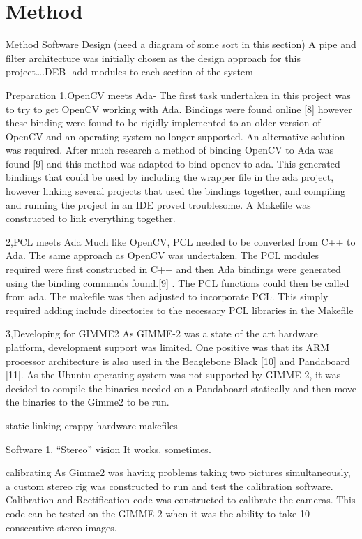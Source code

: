 \section{Method}\label{sec:method}

Method
Software Design (need a diagram of some sort in this section)
A pipe and filter architecture was initially chosen as the design approach for this project….DEB
-add modules to each section of the system



Preparation
1,OpenCV meets Ada-
The first task undertaken in this project was to try to get OpenCV working with Ada. Bindings were found online [8] however these binding were found to be rigidly implemented to an older version of OpenCV and an operating system no longer supported. An alternative solution was required. After much research a method of binding OpenCV to Ada was found [9] and this method was adapted to bind opencv to ada. This generated bindings that could be used by including the wrapper file in the ada project, however linking several projects that used the bindings together, and compiling and running the project in an IDE proved troublesome. A Makefile was constructed to link everything together.


2,PCL meets Ada
Much like OpenCV, PCL needed to be converted from C++ to Ada. The same approach as OpenCV was undertaken. The PCL modules required were first constructed in C++ and then Ada bindings were generated using the binding commands found.[9] . The PCL functions could then be called from ada. The makefile was then adjusted to incorporate PCL. This simply required adding include directories to the necessary PCL libraries in the Makefile 

3,Developing for GIMME2
As GIMME-2 was a state of the art hardware platform, development support was limited. One positive was that its ARM processor architecture is also used in the Beaglebone Black [10] and Pandaboard [11]. As the Ubuntu operating system was not supported by GIMME-2, it was decided to compile the binaries needed on a Pandaboard statically and then move the binaries to the Gimme2 to be run.

static linking
crappy hardware
makefiles

Software
1. “Stereo” vision
It works. sometimes.

calibrating
As Gimme2 was having problems taking two pictures simultaneously, a custom stereo rig was constructed to run and test the calibration software. Calibration and Rectification code was constructed to calibrate the cameras. This code can be tested on the GIMME-2 when it was the ability to take 10 consecutive stereo images.

